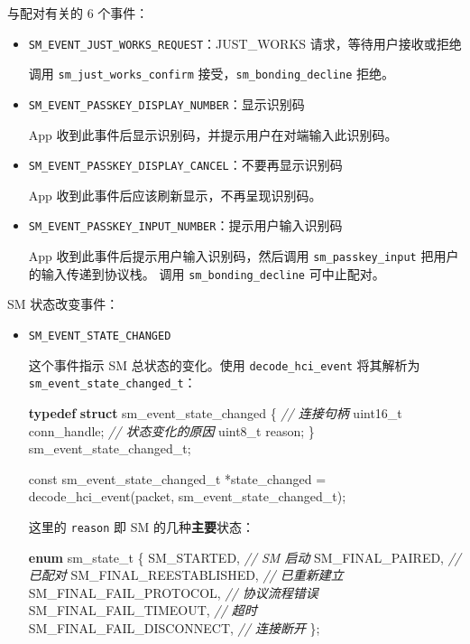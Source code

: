 \documentclass[
  12pt,
]{book}
\newenvironment{Shaded}{\begin{snugshade}}{\end{snugshade}}
\newcommand{\CommentTok}[1]{\textcolor[rgb]{0.56,0.35,0.01}{\textit{#1}}}
\newcommand{\DataTypeTok}[1]{\textcolor[rgb]{0.13,0.29,0.53}{#1}}
\newcommand{\KeywordTok}[1]{\textcolor[rgb]{0.13,0.29,0.53}{\textbf{#1}}}
\newcommand{\NormalTok}[1]{#1}
\begin{document}
与配对有关的 6 个事件：

\begin{itemize}
\item
  \texttt{SM\_EVENT\_JUST\_WORKS\_REQUEST}：JUST\_WORKS 请求，等待用户接收或拒绝

  调用 \texttt{sm\_just\_works\_confirm} 接受，\texttt{sm\_bonding\_decline} 拒绝。
\item
  \texttt{SM\_EVENT\_PASSKEY\_DISPLAY\_NUMBER}：显示识别码

  App 收到此事件后显示识别码，并提示用户在对端输入此识别码。
\item
  \texttt{SM\_EVENT\_PASSKEY\_DISPLAY\_CANCEL}：不要再显示识别码

  App 收到此事件后应该刷新显示，不再呈现识别码。
\item
  \texttt{SM\_EVENT\_PASSKEY\_INPUT\_NUMBER}：提示用户输入识别码

  App 收到此事件后提示用户输入识别码，然后调用 \texttt{sm\_passkey\_input} 把用户的输入传递到协议栈。
  调用 \texttt{sm\_bonding\_decline} 可中止配对。
\end{itemize}

SM 状态改变事件：

\begin{itemize}
\item
  \texttt{SM\_EVENT\_STATE\_CHANGED}

  这个事件指示 SM 总状态的变化。使用 \texttt{decode\_hci\_event} 将其解析为 \texttt{sm\_event\_state\_changed\_t}：

\begin{Shaded}
\begin{Highlighting}[]
\KeywordTok{typedef} \KeywordTok{struct}\NormalTok{ sm_event_state_changed \{}
  \CommentTok{// 连接句柄}
  \DataTypeTok{uint16_t}\NormalTok{ conn_handle;}
  \CommentTok{// 状态变化的原因}
  \DataTypeTok{uint8_t}\NormalTok{ reason;}
\NormalTok{\} sm_event_state_changed_t;}

\DataTypeTok{const}\NormalTok{ sm_event_state_changed_t *state_changed =}
\NormalTok{  decode_hci_event(packet, sm_event_state_changed_t);}
\end{Highlighting}
\end{Shaded}

  这里的 \texttt{reason} 即 SM 的几种\textbf{主要}状态：

\begin{Shaded}
\begin{Highlighting}[]
\KeywordTok{enum}\NormalTok{ sm_state_t}
\NormalTok{\{}
\NormalTok{  SM_STARTED,                 }\CommentTok{// SM 启动}
\NormalTok{  SM_FINAL_PAIRED,            }\CommentTok{// 已配对}
\NormalTok{  SM_FINAL_REESTABLISHED,     }\CommentTok{// 已重新建立}
\NormalTok{  SM_FINAL_FAIL_PROTOCOL,     }\CommentTok{// 协议流程错误}
\NormalTok{  SM_FINAL_FAIL_TIMEOUT,      }\CommentTok{// 超时}
\NormalTok{  SM_FINAL_FAIL_DISCONNECT,   }\CommentTok{// 连接断开}
\NormalTok{\};}
\end{Highlighting}
\end{Shaded}
\end{itemize}
\end{document}
